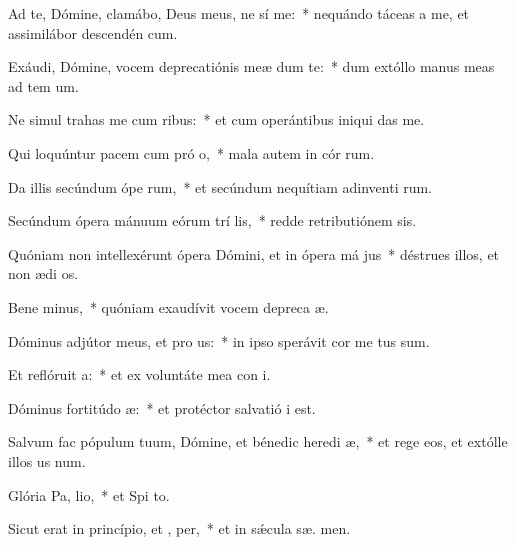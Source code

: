 \item Ad te, Dómine, clamábo, Deus meus, ne sí  me:~* nequándo táceas a me, et assimilábor descendén  cum.
\item Exáudi, Dómine, vocem deprecatiónis meæ dum   te:~* dum extóllo manus meas ad tem  um.
\item Ne simul trahas me cum ribus:~* et cum operántibus iniqui  das me.
\item Qui loquúntur pacem cum pró o,~* mala autem in cór rum.
\item Da illis secúndum ópe rum,~* et secúndum nequítiam adinventi rum.
\item Secúndum ópera mánuum eórum trí lis,~* redde retributiónem  sis.
\item Quóniam non intellexérunt ópera Dómini, et in ópera má jus~* déstrues illos, et non ædi os.
\item Bene minus,~* quóniam exaudívit vocem depreca æ.
\item Dóminus adjútor meus, et pro us:~* in ipso sperávit cor me  tus sum.
\item Et reflóruit  a:~* et ex voluntáte mea con i.
\item Dóminus fortitúdo  æ:~* et protéctor salvatió  i est.
\item Salvum fac pópulum tuum, Dómine, et bénedic heredi æ,~* et rege eos, et extólle illos us  num.
\item Glória Pa,  lio,~* et Spi to.
\item Sicut erat in princípio, et ,  per,~* et in sǽcula sæ. men.
